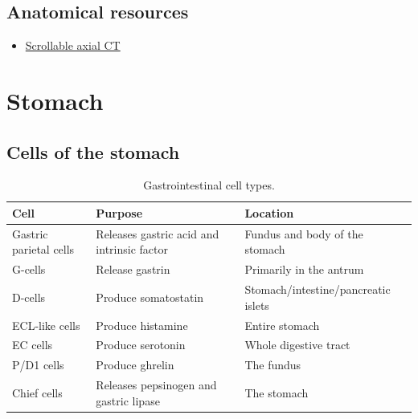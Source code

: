 \subsection{Anatomical resources}

\begin{itemize}
	\item \href{https://commons.wikimedia.org/wiki/Scrollable_computed_tomography_images_of_a_normal_abdomen_and_pelvis}{Scrollable axial CT}
	
\end{itemize}

\clearpage
\section{Stomach}

\subsection{Cells of the stomach}
\begin{table}[htbp]
    \centering
    \footnotesize
    \setlength{\tabcolsep}{3pt}
    \renewcommand{\arraystretch}{1.25}

    \begin{tabularx}{\textwidth}{
        @{}
        >{\RaggedRight\arraybackslash}p{1.9cm}
        >{\RaggedRight\arraybackslash}X
        >{\RaggedRight\arraybackslash}p{2.4cm}
        @{}
    }
        \toprule
        \textbf{Cell} &
        \textbf{Purpose} &
        \textbf{Location}\\
        \midrule

        Gastric parietal cells & Releases gastric acid and intrinsic factor & Fundus and body of the stomach\\

        G-cells & Release gastrin &Primarily in the antrum\\

        D-cells & Produce somatostatin & Stomach/intestine/pancreatic islets\\

        ECL-like cells & Produce histamine & Entire stomach\\

        EC cells & Produce serotonin & Whole digestive tract\\

        P/D1 cells & Produce ghrelin & The fundus\\

        Chief cells & Releases pepsinogen and gastric lipase & The stomach\\
        \bottomrule
    \end{tabularx}

    \caption{Gastrointestinal cell types.}
    \label{tab:cells_of_stomach}
\end{table}

